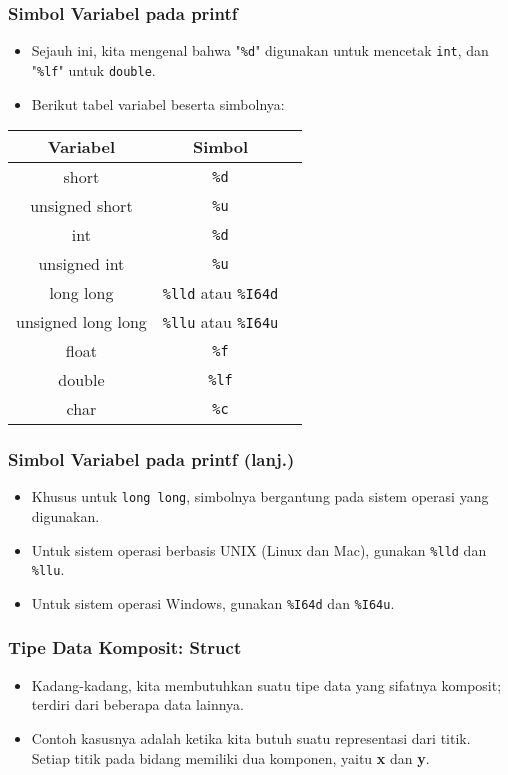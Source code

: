 \begin{frame}[fragile]
\frametitle{Simbol Variabel pada printf}
\begin{itemize}
  \item Sejauh ini, kita mengenal bahwa "\texttt{\%d}" digunakan untuk mencetak \texttt{int}, dan "\texttt{\%lf}" untuk \texttt{double}.
  \item Berikut tabel variabel beserta simbolnya:
\end{itemize}
\begin{table}[ht]
  \begin{tabular}{|c|c|c|}
    \hline Variabel  & Simbol \\
    \hline short & \texttt{\%d} \\
    \hline unsigned short & \texttt{\%u} \\
    \hline int & \texttt{\%d} \\
    \hline unsigned int & \texttt{\%u} \\
    \hline long long & \texttt{\%lld} atau \texttt{\%I64d} \\
    \hline unsigned long long & \texttt{\%llu} atau \texttt{\%I64u} \\
    \hline float & \texttt{\%f} \\
    \hline double & \texttt{\%lf} \\
    \hline char &  \texttt{\%c} \\
    \hline
  \end{tabular}
\end{table}
\end{frame}

\begin{frame}[fragile]
\frametitle{Simbol Variabel pada printf (lanj.)}
\begin{itemize}
  \item Khusus untuk \texttt{long long}, simbolnya bergantung pada sistem operasi yang digunakan.
  \item Untuk sistem operasi berbasis UNIX (Linux dan Mac), gunakan \texttt{\%lld} dan \texttt{\%llu}.
  \item Untuk sistem operasi Windows, gunakan \texttt{\%I64d} dan \texttt{\%I64u}.
\end{itemize}
\end{frame}

\begin{frame}
\frametitle{Tipe Data Komposit: Struct}
\begin{itemize}
  \item Kadang-kadang, kita membutuhkan suatu tipe data yang sifatnya komposit; terdiri dari beberapa data lainnya.
  \item Contoh kasusnya adalah ketika kita butuh suatu representasi dari titik. Setiap titik pada bidang memiliki dua komponen, yaitu \textbf{x} dan \textbf{y}.
\end{itemize}
\end{frame}

